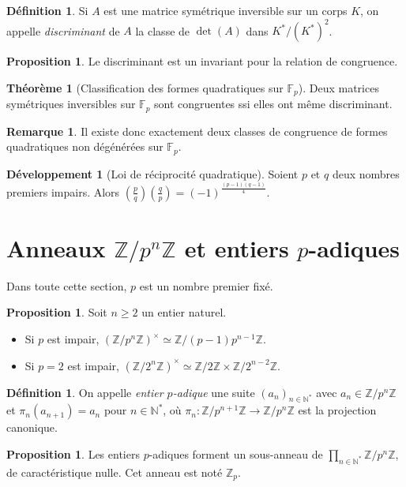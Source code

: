 \documentclass[a5paper, 10pt]{article}
\theoremstyle{definition}
\newtheorem{definition}[equation]{Définition}
\newtheorem{proposition}[equation]{Proposition}
\newtheorem{theorem}[equation]{Théorème}
\newtheorem{remark}[equation]{Remarque}
\newcounter{n}
\newtheorem{dev}[n]{Développement}
\def\F{\mathbb{F}}
\def\Z{\mathbb{Z}}
\def\N{\mathbb{N}}
\begin{document}
\begin{definition}
  Si $A$ est une matrice symétrique inversible sur un corps $K$, on
  appelle \emph{discriminant} de $A$ la classe de $\det(A)$ dans
  $K^*/{(K^*)}^2$.
\end{definition}
\begin{proposition}
  Le discriminant est un invariant pour la relation de congruence.
\end{proposition}
\begin{theorem}[Classification des formes quadratiques sur $\F_p$]
  Deux matrices symétriques inversibles sur $\F_p$ sont congruentes
  ssi elles ont même discriminant.
\end{theorem}
\begin{remark}
  Il existe donc exactement deux classes de congruence de formes
  quadratiques non dégénérées sur $\F_p$.
\end{remark}

\begin{dev}[Loi de réciprocité quadratique]
  Soient $p$ et $q$ deux nombres premiers impairs. Alors
  $\displaystyle \left(\frac{p}{q}\right)\left(\frac{q}{p}\right) =
  {(-1)}^{\frac{(p-1)(q-1)}{4}}$.
\end{dev}

\section{Anneaux $\Z/p^n\Z$ et entiers $p$-adiques}

Dans toute cette section, $p$ est un nombre premier fixé.

\begin{proposition}
  Soit $n \geq 2$ un entier naturel.
  \begin{itemize}
  \item Si $p$ est impair, ${(\Z/p^n\Z)}^\times \simeq \Z/(p-1)p^{n-1}\Z$.
  \item Si $p = 2$ est impair, ${(\Z/2^n\Z)}^\times \simeq \Z/2\Z \times \Z/2^{n-2}\Z$.
  \end{itemize}
\end{proposition}
\begin{definition}
  On appelle \emph{entier $p$-adique} une suite $(a_n)_{n \in \N^*}$
  avec $a_n \in \Z/p^n\Z$ et $\pi_n(a_{n+1}) = a_n$ pour $n \in \N^*$,
  où $\pi_n : \Z/p^{n+1}\Z \to \Z/p^n\Z$ est la projection canonique.
\end{definition}
\begin{proposition}
  Les entiers $p$-adiques forment un sous-anneau de
  $\prod_{n \in \N^*} \Z/p^n\Z$, de caractéristique nulle. Cet anneau
  est noté $\Z_p$.
\end{proposition}
\end{document}
